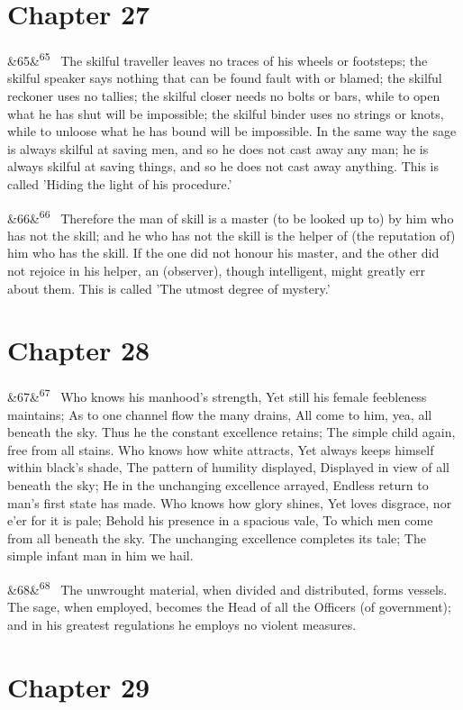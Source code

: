\documentclass[12pt]{article}
\newcommand{\para}[1][]{\par\noindent\ifx&#1&\else\textsuperscript{\footnotesize #1}~\fi}
\begin{document}
\section*{Chapter 27}

\para[65] The skilful traveller leaves no traces of his wheels or footsteps; the skilful speaker says nothing that can be found fault with or blamed; the skilful reckoner uses no tallies; the skilful closer needs no bolts or bars, while to open what he has shut will be impossible; the skilful binder uses no strings or knots, while to unloose what he has bound will be impossible. In the same way the sage is always skilful at saving men, and so he does not cast away any man; he is always skilful at saving things, and so he does not cast away anything. This is called 'Hiding the light of his procedure.'

\para[66] Therefore the man of skill is a master (to be looked up to) by him who has not the skill; and he who has not the skill is the helper of (the reputation of) him who has the skill. If the one did not honour his master, and the other did not rejoice in his helper, an (observer), though intelligent, might greatly err about them. This is called 'The utmost degree of mystery.'

\section*{Chapter 28}

\para[67] Who knows his manhood's strength, Yet still his female feebleness maintains; As to one channel flow the many drains, All come to him, yea, all beneath the sky. Thus he the constant excellence retains; The simple child again, free from all stains. Who knows how white attracts, Yet always keeps himself within black's shade, The pattern of humility displayed, Displayed in view of all beneath the sky; He in the unchanging excellence arrayed, Endless return to man's first state has made. Who knows how glory shines, Yet loves disgrace, nor e'er for it is pale; Behold his presence in a spacious vale, To which men come from all beneath the sky. The unchanging excellence completes its tale; The simple infant man in him we hail.

\para[68] The unwrought material, when divided and distributed, forms vessels. The sage, when employed, becomes the Head of all the Officers (of government); and in his greatest regulations he employs no violent measures.

\section*{Chapter 29}
\end{document}
